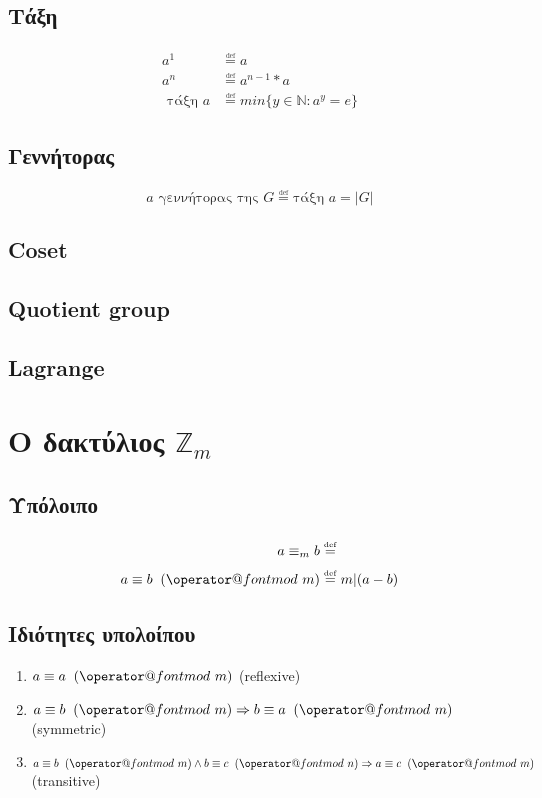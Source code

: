 \documentclass[11pt,a4paper]{book}
\makeatletter
\newcommand{\defeq}{\overset{\underset{\mathrm{def}}{}}{=}}
\def\imod#1{\allowbreak\mkern10mu({\operator@font mod}\,\,#1)}
\makeatother
\begin{document}
\subsection*{Τάξη}
\begin{align*}
	a^1 &\defeq a\\
	a^n &\defeq a^{n - 1} * a\\
	\text{ τάξη } a &\defeq min\{ y \in \mathbb{N}: a^y = e \}
\end{align*}

\subsection*{Γεννήτορας}
\[
	a \text{ γεννήτορας της } G \defeq \text{τάξη } a = |G|
\]

\subsection*{\textlatin{Coset}}

\subsection*{\textlatin{Quotient group}}

\subsection*{\textlatin{Lagrange}}

\section*{Ο δακτύλιος $\mathbb{Z}_m$}

\subsection*{Υπόλοιπο}

\begin{align*}
	a \equiv_m b &\defeq \\
	a \equiv b \imod m &\defeq m | ( a - b )
\end{align*}

\subsection*{Ιδιότητες υπολοίπου}

\begin{enumerate}
	\item $a \equiv a \imod m$ (\textlatin{reflexive})
	\item $a \equiv b \imod m \Rightarrow b \equiv a \imod m$ (\textlatin{symmetric})
	\item $a \equiv b \imod m \land b \equiv c \imod n \Rightarrow a \equiv c \imod m$ (\textlatin{transitive})
\end{enumerate}
\end{document}
